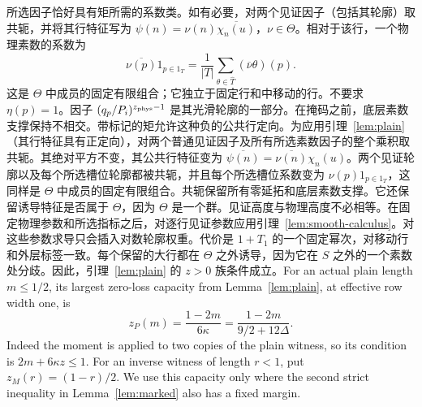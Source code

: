 \documentclass[11pt,a4paper]{article}
\numberwithin{equation}{section}
\numberwithin{figure}{section}
\theoremstyle{definition}
\theoremstyle{remark}
\begin{document}
所选因子恰好具有矩所需的系数类。如有必要，对两个见证因子（包括其轮廓）取共轭，并将其行特征写为 \(\psi(n)=\nu(n)\overline{\chi_n(u)}\)，\(\nu\in\Theta\)。相对于该行，一个物理素数的系数为
\[
 \overline{\nu(p)}1_{p\in1_T}
 =\frac1{|T|}\sum_{\theta\in\widehat T}
       (\overline{\nu}\theta)(p).
\]
这是 \(\Theta\) 中成员的固定有限组合；它独立于固定行和中移动的行。不要求 \(\eta(p)=1\)。因子 \((q_p/P_i)^{z_{\rm phys}-1}\) 是其光滑轮廓的一部分。在掩码之前，底层素数支撑保持不相交。带标记的矩允许这种负的公共行定向。为应用引理~\ref{lem:plain}（其行特征具有正定向），对两个普通见证因子及所有所选素数因子的整个乘积取共轭。其绝对平方不变，其公共行特征变为 \(\overline{\psi(n)}=\overline{\nu(n)}\chi_n(u)\)。两个见证轮廓以及每个所选槽位轮廓都被共轭，并且每个所选槽位系数变为 \(\nu(p)1_{p\in1_T}\)，这同样是 \(\Theta\) 中成员的固定有限组合。共轭保留所有零延拓和底层素数支撑。它还保留诱导特征是否属于 \(\Theta\)，因为 \(\Theta\) 是一个群。见证高度与物理高度不必相等。在固定物理参数和所选指标之后，对逐行见证参数应用引理~\ref{lem:smooth-calculus}。对这些参数求导只会插入对数轮廓权重。代价是 \(1+T_1\) 的一个固定幂次，对移动行和外层标签一致。每个保留的大行都在 \(\Theta\) 之外诱导，因为它在 \(S\) 之外的一个素数处分歧。因此，引理~\ref{lem:plain} 的 \(z>0\) 族条件成立。For an actual plain length \(m\le1/2\), its largest zero-loss
capacity from Lemma~\ref{lem:plain}, at effective row width one, is
\begin{equation}
 z_P(m)=\frac{1-2m}{6\kappa}
       =\frac{1-2m}{9/2+12\Delta}.
 \label{eq:plain-zero-loss-capacity}
\end{equation}
Indeed the moment is applied to two copies of the plain witness,
so its condition is \(2m+6\kappa z\le1\).
For an inverse witness of length \(r<1\), put
\(z_M(r)=(1-r)/2\).  We use this capacity only where the second
strict inequality in Lemma~\ref{lem:marked} also has a fixed margin.
\end{document}
